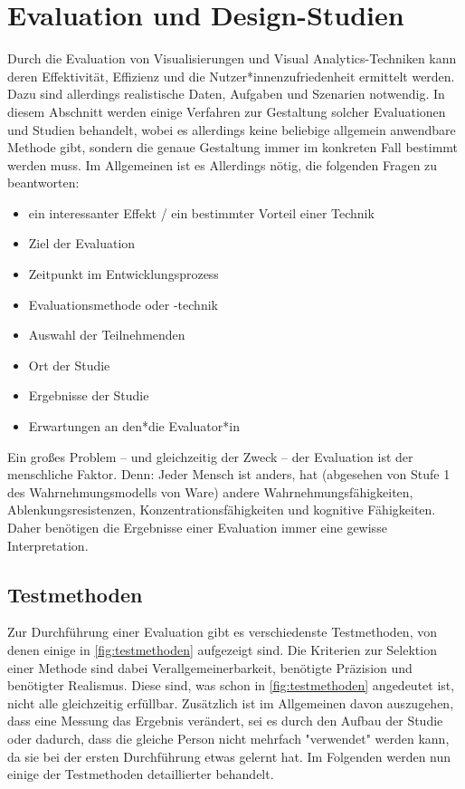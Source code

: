 \section{Evaluation und Design-Studien} %
Durch die Evaluation von Visualisierungen und Visual Analytics-Techniken kann deren Effektivität, Effizienz und die Nutzer*innenzufriedenheit ermittelt werden. Dazu sind allerdings realistische Daten, Aufgaben und Szenarien notwendig. In diesem Abschnitt werden einige Verfahren zur Gestaltung solcher Evaluationen und Studien behandelt, wobei es allerdings keine beliebige allgemein anwendbare Methode gibt, sondern die genaue Gestaltung immer im konkreten Fall bestimmt werden muss. Im Allgemeinen ist es Allerdings nötig, die folgenden Fragen zu beantworten:
\begin{itemize}
	\item {} ein interessanter Effekt / ein bestimmter Vorteil einer Technik
	\item {} Ziel der Evaluation
	\item {}  Zeitpunkt im Entwicklungsprozess
	\item {}   Evaluationsmethode oder -technik
	\item {}   Auswahl der Teilnehmenden
	\item {}    Ort der Studie
	\item {} Ergebnisse der Studie
	\item {}   Erwartungen an den*die Evaluator*in
\end{itemize}
Ein großes Problem -- und gleichzeitig der Zweck -- der Evaluation ist der menschliche Faktor. Denn: Jeder Mensch ist anders, hat (abgesehen von Stufe 1 des Wahrnehmungsmodells von Ware) andere Wahrnehmungsfähigkeiten, Ablenkungsresistenzen, Konzentrationsfähigkeiten und kognitive Fähigkeiten. Daher benötigen die Ergebnisse einer Evaluation immer eine gewisse Interpretation.

\subsection{Testmethoden}
	Zur Durchführung einer Evaluation gibt es verschiedenste Testmethoden, von denen einige in \autoref{fig:testmethoden} aufgezeigt sind. Die Kriterien zur Selektion einer Methode sind dabei \bspw Verallgemeinerbarkeit, benötigte Präzision und benötigter Realismus. Diese sind, was schon in \autoref{fig:testmethoden} angedeutet ist, nicht alle gleichzeitig erfüllbar. Zusätzlich ist im Allgemeinen davon auszugehen, dass eine Messung das Ergebnis verändert, sei es durch den Aufbau der Studie oder dadurch, dass die gleiche Person nicht mehrfach "verwendet" werden kann, da sie bei der ersten Durchführung etwas gelernt hat. Im Folgenden werden nun einige der Testmethoden detaillierter behandelt.

